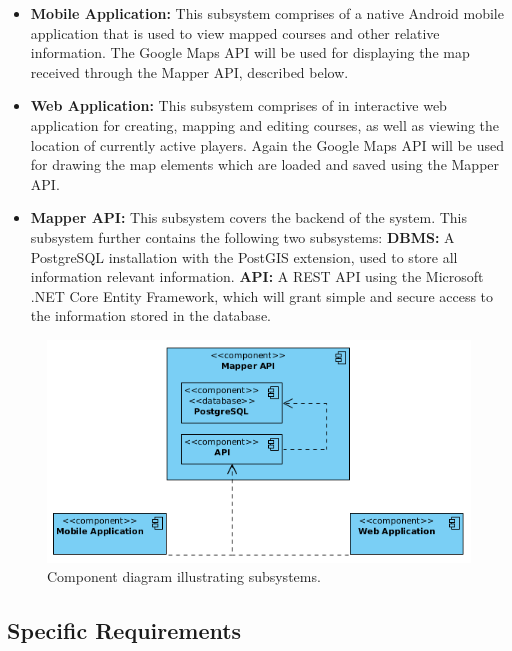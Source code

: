 \documentclass{article}
\begin{document}
    \begin{itemize}
        \item \textbf{Mobile Application:} This subsystem comprises of a native
            Android mobile application that is used to view mapped courses and
            other relative information. The Google Maps API will be used for
            displaying the map received through the Mapper API, described
            below.
        \item \textbf{Web Application:} This subsystem comprises of in
            interactive web application for creating, mapping and editing
            courses, as well as viewing the location of currently active
            players. Again the Google Maps API will be used for drawing the map
            elements which are loaded and saved using the Mapper API.
        \item \textbf{Mapper API:} This subsystem covers the backend of the
            system. This subsystem further contains the following two
            subsystems:
            \subitem \textbf{DBMS:} A PostgreSQL installation with the PostGIS
            extension, used to store all information relevant information.
            \subitem \textbf{API:} A REST API using the Microsoft .NET Core
            Entity Framework, which will grant simple and secure access to the
            information stored in the database.
    \end{itemize}

    \begin{figure}[h!]
        \centering
        \includegraphics[scale=0.6]{ComponentDiagram}
        \caption{Component diagram illustrating subsystems.}
        \label{fig:component}
    \end{figure}

    \subsection{Specific Requirements}
    \label{sec:requirements}
\end{document}
